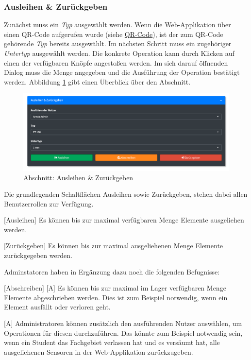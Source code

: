 \documentclass[
]{article}
\begin{document}
\hypertarget{ausleihen-zuruxfcckgeben}{%
\subsubsection{Ausleihen \& Zurückgeben}\label{ausleihen-zuruxfcckgeben}}

Zunächst muss ein \emph{Typ} ausgewählt werden. Wenn die Web-Applikation über einen QR-Code aufgerufen wurde (siehe \protect\hyperlink{qrcode}{QR-Code}), ist der zum QR-Code gehörende \emph{Typ} bereits ausgewählt. Im nächsten Schritt muss ein zugehöriger \emph{Untertyp} ausgewählt werden. Die konkrete Operation kann durch Klicken auf einen der verfügbaren Knöpfe angestoßen werden. Im sich darauf öffnenden Dialog muss die Menge angegeben und die Ausführung der Operation bestätigt werden. Abbildung \ref{fig:operate-detail-circulate} gibt einen Überblick über den Abschnitt.

\begin{figure}
\centering
\includegraphics{./img/operate_detail_circulate.png}
\caption{\label{fig:operate-detail-circulate}Abschnitt: Ausleihen \& Zurückgeben}
\end{figure}

Die grundlegenden Schaltflächen Ausleihen sowie Zurückgeben, stehen dabei allen Benutzerrollen zur Verfügung.

{[}Ausleihen{]} Es können bis zur maximal verfügbaren Menge Elemente ausgeliehen werden.

{[}Zurückgeben{]} Es können bis zur maximal ausgeliehenen Menge Elemente zurückgegeben werden.

Adminstatoren haben in Ergänzung dazu noch die folgenden Befugnisse:

{[}Abschreiben{]} {[}A{]} Es können bis zur maximal im Lager verfügbaren Menge Elemente abgeschrieben werden. Dies ist zum Beispiel notwendig, wenn ein Element ausfällt oder verloren geht.

{[}A{]} Administratoren können zusätzlich den ausführenden Nutzer auswählen, um Operationen für diesen durchzuführen. Das könnte zum Beispiel notwendig sein, wenn ein Student das Fachgebiet verlassen hat und es versäumt hat, alle ausgeliehenen Sensoren in der Web-Applikation zurückzugeben.
\end{document}
